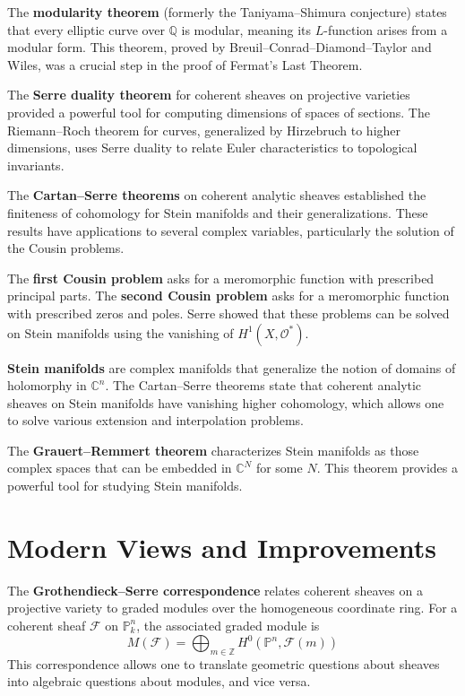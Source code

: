 The \textbf{modularity theorem} (formerly the Taniyama--Shimura conjecture) states that every elliptic curve over $\mathbb{Q}$ is modular, meaning its $L$-function arises from a modular form. This theorem, proved by Breuil--Conrad--Diamond--Taylor and Wiles, was a crucial step in the proof of Fermat's Last Theorem.

The \textbf{Serre duality theorem} for coherent sheaves on projective varieties provided a powerful tool for computing dimensions of spaces of sections. The Riemann--Roch theorem for curves, generalized by Hirzebruch to higher dimensions, uses Serre duality to relate Euler characteristics to topological invariants.

The \textbf{Cartan--Serre theorems} on coherent analytic sheaves established the finiteness of cohomology for Stein manifolds and their generalizations. These results have applications to several complex variables, particularly the solution of the Cousin problems.

The \textbf{first Cousin problem} asks for a meromorphic function with prescribed principal parts. The \textbf{second Cousin problem} asks for a meromorphic function with prescribed zeros and poles. Serre showed that these problems can be solved on Stein manifolds using the vanishing of $H^1(X, \mathcal{O}^*)$.

\textbf{Stein manifolds} are complex manifolds that generalize the notion of domains of holomorphy in $\mathbb{C}^n$. The Cartan--Serre theorems state that coherent analytic sheaves on Stein manifolds have vanishing higher cohomology, which allows one to solve various extension and interpolation problems.

The \textbf{Grauert--Remmert theorem} characterizes Stein manifolds as those complex spaces that can be embedded in $\mathbb{C}^N$ for some $N$. This theorem provides a powerful tool for studying Stein manifolds.

\section{Modern Views and Improvements}

The \textbf{Grothendieck--Serre correspondence} relates coherent sheaves on a projective variety to graded modules over the homogeneous coordinate ring. For a coherent sheaf $\mathcal{F}$ on $\mathbb{P}^n_k$, the associated graded module is
\[M(\mathcal{F}) = \bigoplus_{m \in \mathbb{Z}} H^0(\mathbb{P}^n, \mathcal{F}(m))\]
This correspondence allows one to translate geometric questions about sheaves into algebraic questions about modules, and vice versa.

